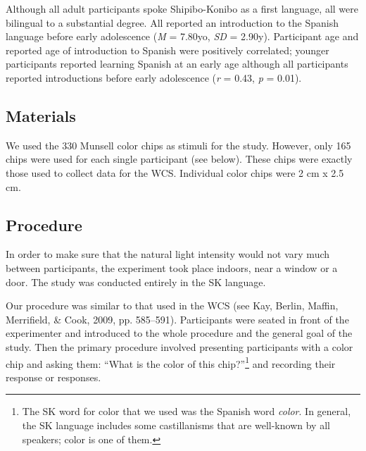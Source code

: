 \documentclass[,man,floatsintext]{apa6}
\let\rmarkdownfootnote\footnote%
\def\footnote{\protect\rmarkdownfootnote}
\theoremstyle{definition}
\theoremstyle{definition}
\theoremstyle{definition}
\theoremstyle{remark}
\begin{document}
Although all adult participants spoke Shipibo-Konibo as a first
language, all were bilingual to a substantial degree. All reported an
introduction to the Spanish language before early adolescence (\emph{M}
= 7.80yo, \emph{SD} = 2.90y). Participant age and reported age of
introduction to Spanish were positively correlated; younger participants
reported learning Spanish at an early age although all participants
reported introductions before early adolescence (\emph{r} = 0.43,
\emph{p} = 0.01).

\subsection{Materials}\label{materials}

We used the 330 Munsell color chips as stimuli for the study. However,
only 165 chips were used for each single participant (see below). These
chips were exactly those used to collect data for the WCS. Individual
color chips were 2 cm x 2.5 cm.

\subsection{Procedure}\label{procedure}

In order to make sure that the natural light intensity would not vary
much between participants, the experiment took place indoors, near a
window or a door. The study was conducted entirely in the SK language.

Our procedure was similar to that used in the WCS (see Kay, Berlin,
Maffin, Merrifield, \& Cook, 2009, pp. 585--591). Participants were
seated in front of the experimenter and introduced to the whole
procedure and the general goal of the study. Then the primary procedure
involved presenting participants with a color chip and asking them:
\enquote{What is the color of this chip?}\footnote{The SK word for color
  that we used was the Spanish word \emph{color}. In general, the SK
  language includes some castillanisms that are well-known by all
  speakers; color is one of them.} and recording their response or
responses.
\end{document}

